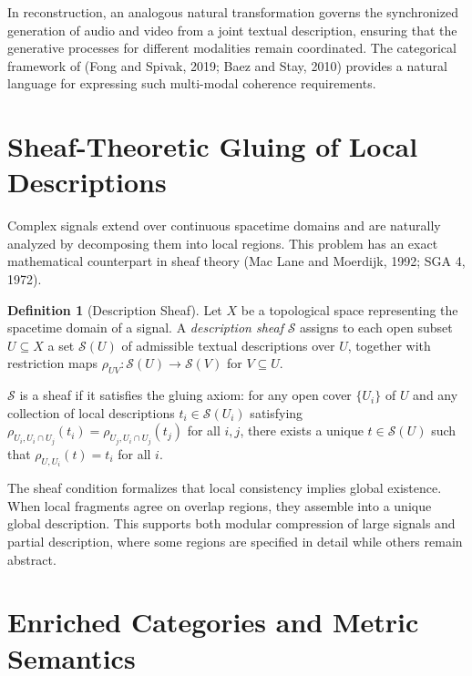 \documentclass[11pt,a4paper]{article}
\theoremstyle{definition}
\newtheorem{definition}[theorem]{Definition}
\theoremstyle{remark}
\begin{document}
In reconstruction, an analogous natural transformation governs the synchronized generation of audio and video from a joint textual description, ensuring that the generative processes for different modalities remain coordinated. The categorical framework of (Fong and Spivak, 2019; Baez and Stay, 2010) provides a natural language for expressing such multi-modal coherence requirements.

\section{Sheaf-Theoretic Gluing of Local Descriptions}
\label{sec:sheaves}

Complex signals extend over continuous spacetime domains and are naturally analyzed by decomposing them into local regions. This problem has an exact mathematical counterpart in sheaf theory (Mac Lane and Moerdijk, 1992; SGA 4, 1972).

\begin{definition}[Description Sheaf]
Let $X$ be a topological space representing the spacetime domain of a signal. A \emph{description sheaf} $\mathcal{S}$ assigns to each open subset $U \subseteq X$ a set $\mathcal{S}(U)$ of admissible textual descriptions over $U$, together with restriction maps $\rho_{UV} : \mathcal{S}(U) \rightarrow \mathcal{S}(V)$ for $V \subseteq U$.

$\mathcal{S}$ is a sheaf if it satisfies the gluing axiom: for any open cover $\{U_i\}$ of $U$ and any collection of local descriptions $t_i \in \mathcal{S}(U_i)$ satisfying $\rho_{U_i, U_i \cap U_j}(t_i) = \rho_{U_j, U_i \cap U_j}(t_j)$ for all $i,j$, there exists a unique $t \in \mathcal{S}(U)$ such that $\rho_{U, U_i}(t) = t_i$ for all $i$.
\end{definition}

The sheaf condition formalizes that local consistency implies global existence. When local fragments agree on overlap regions, they assemble into a unique global description. This supports both modular compression of large signals and partial description, where some regions are specified in detail while others remain abstract.

\section{Enriched Categories and Metric Semantics}
\label{sec:enriched}
\end{document}
